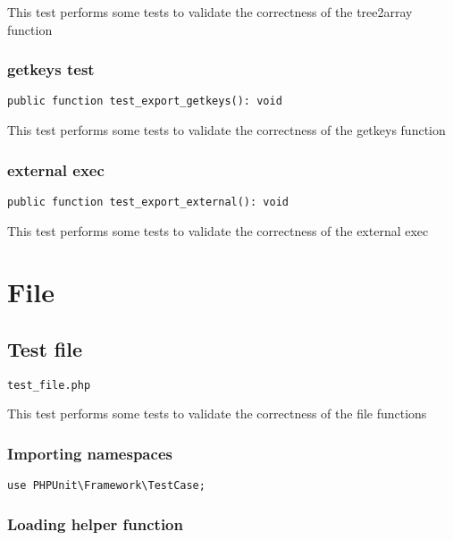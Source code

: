 \documentclass[a4paper]{article}
\begin{document}
This test performs some tests to validate the correctness
of the tree2array function

\hypertarget{toc184}{}
\subsubsection{getkeys test}

\begin{lstlisting}
public function test_export_getkeys(): void
\end{lstlisting}

This test performs some tests to validate the correctness
of the getkeys function

\hypertarget{toc185}{}
\subsubsection{external exec}

\begin{lstlisting}
public function test_export_external(): void
\end{lstlisting}

This test performs some tests to validate the correctness
of the external exec


\hypertarget{toc186}{}
\section{File}

\hypertarget{toc187}{}
\subsection{Test file}

\begin{lstlisting}
test_file.php
\end{lstlisting}

This test performs some tests to validate the correctness
of the file functions

\hypertarget{toc188}{}
\subsubsection{Importing namespaces}

\begin{lstlisting}
use PHPUnit\Framework\TestCase;
\end{lstlisting}

\hypertarget{toc189}{}
\subsubsection{Loading helper function}
\end{document}
